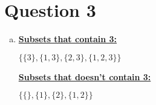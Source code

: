 \documentclass[12pt]{article}
\begin{document}
\section*{Question 3}
\begin{enumerate}[a.]
    \item

    \underline{\textbf{Subsets that contain 3:}}

    \bigskip

    $\{ \{3\}, \{1,3\}, \{2,3\}, \{1,2,3\} \}$

    \bigskip

    \underline{\textbf{Subsets that doesn't contain 3:}}

    \bigskip

    $\{ \{\}, \{1\}, \{2\}, \{1,2\} \}$

\end{enumerate}
\end{document}
